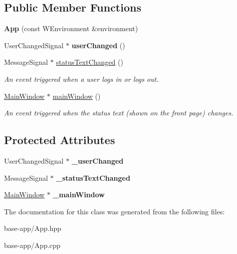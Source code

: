 \subsection*{Public Member Functions}
\begin{DoxyCompactItemize}
\item 
\hypertarget{classmy__app_1_1App_a7fd2a46d6c87ffde1d8ad1487eb307ae}{
{\bfseries App} (const WEnvironment \&environment)}
\label{classmy__app_1_1App_a7fd2a46d6c87ffde1d8ad1487eb307ae}

\item 
\hypertarget{classmy__app_1_1App_abcba71ade4c1d7e9cee4e9aa9a4f26da}{
UserChangedSignal $\ast$ {\bfseries userChanged} ()}
\label{classmy__app_1_1App_abcba71ade4c1d7e9cee4e9aa9a4f26da}

\item 
\hypertarget{classmy__app_1_1App_a2e1f3a27b1a27f60582525c91d1eb159}{
MessageSignal $\ast$ \hyperlink{classmy__app_1_1App_a2e1f3a27b1a27f60582525c91d1eb159}{statusTextChanged} ()}
\label{classmy__app_1_1App_a2e1f3a27b1a27f60582525c91d1eb159}

\begin{DoxyCompactList}\small\item\em An event triggered when a user logs in or logs out. \item\end{DoxyCompactList}\item 
\hypertarget{classmy__app_1_1App_a83d2592565c6f3eeb8dc4c93c4c082a4}{
\hyperlink{classmy__app_1_1MainWindow}{MainWindow} $\ast$ \hyperlink{classmy__app_1_1App_a83d2592565c6f3eeb8dc4c93c4c082a4}{mainWindow} ()}
\label{classmy__app_1_1App_a83d2592565c6f3eeb8dc4c93c4c082a4}

\begin{DoxyCompactList}\small\item\em An event triggered when the status text (shown on the front page) changes. \item\end{DoxyCompactList}\end{DoxyCompactItemize}
\subsection*{Protected Attributes}
\begin{DoxyCompactItemize}
\item 
\hypertarget{classmy__app_1_1App_a89c0791af9e0e4f387aaa1cdd4cefc45}{
UserChangedSignal $\ast$ {\bfseries \_\-userChanged}}
\label{classmy__app_1_1App_a89c0791af9e0e4f387aaa1cdd4cefc45}

\item 
\hypertarget{classmy__app_1_1App_af3fe49c94c9d614f537c54317bb6de7f}{
MessageSignal $\ast$ {\bfseries \_\-statusTextChanged}}
\label{classmy__app_1_1App_af3fe49c94c9d614f537c54317bb6de7f}

\item 
\hypertarget{classmy__app_1_1App_a7af024b6866793c8aaee648da3ab7c78}{
\hyperlink{classmy__app_1_1MainWindow}{MainWindow} $\ast$ {\bfseries \_\-mainWindow}}
\label{classmy__app_1_1App_a7af024b6866793c8aaee648da3ab7c78}

\end{DoxyCompactItemize}


The documentation for this class was generated from the following files:\begin{DoxyCompactItemize}
\item 
base-\/app/App.hpp\item 
base-\/app/App.cpp\end{DoxyCompactItemize}
